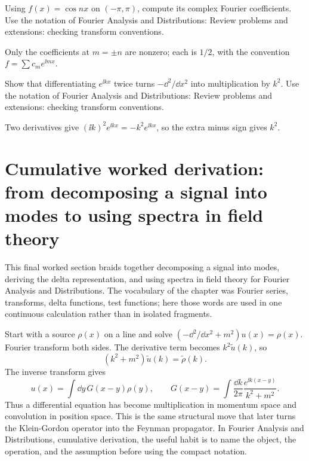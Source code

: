 \begin{exercise}
Using \(f(x)=\cos nx\) on \((-\pi,\pi)\), compute its complex Fourier coefficients.  Use the notation of Fourier Analysis and Distributions: Review problems and extensions: checking transform conventions.
\begin{answer}
Only the coefficients at \(m=\pm n\) are nonzero; each is \(1/2\), with the convention \(f=\sum c_me^{\ii mx}\).
\end{answer}
\end{exercise}

\begin{exercise}
Show that differentiating \(e^{\ii kx}\) twice turns \(-\dd^2/\dd x^2\) into multiplication by \(k^2\).  Use the notation of Fourier Analysis and Distributions: Review problems and extensions: checking transform conventions.
\begin{answer}
Two derivatives give \((\ii k)^2e^{\ii kx}=-k^2e^{\ii kx}\), so the extra minus sign gives \(k^2\).
\end{answer}
\end{exercise}



\section{Cumulative worked derivation: from decomposing a signal into modes to using spectra in field theory}

This final worked section braids together decomposing a signal into modes, deriving the delta representation, and using spectra in field theory for Fourier Analysis and Distributions.  The vocabulary of the chapter was Fourier series, transforms, delta functions, test functions; here those words are used in one continuous calculation rather than in isolated fragments.

Start with a source \(\rho(x)\) on a line and solve \((-\dd^2/\dd x^2+m^2)u(x)=\rho(x)\).  Fourier transform both sides.  The derivative term becomes \(k^2\tilde u(k)\), so
\[
  (k^2+m^2)\tilde u(k)=\tilde\rho(k).
\]
The inverse transform gives
\[
  u(x)=\int\dd y\,G(x-y)\rho(y),
  \qquad
  G(x-y)=\int\frac{\dd k}{2\pi}\frac{e^{\ii k(x-y)}}{k^2+m^2}.
\]
Thus a differential equation has become multiplication in momentum space and convolution in position space.  This is the same structural move that later turns the Klein-Gordon operator into the Feynman propagator.  In Fourier Analysis and Distributions, cumulative derivation, the useful habit is to name the object, the operation, and the assumption before using the compact notation.


